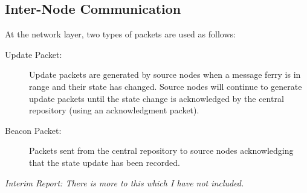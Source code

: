 \subsection{Inter-Node Communication}


At the network layer, two types of packets are used as follows:

\begin{description}
\item[Update Packet: ]
Update packets are generated by source nodes when a message ferry is in range and their state has changed. 
Source nodes will continue to generate update packets until the state change is acknowledged by the central repository (using an acknowledgment packet).
\item[Beacon Packet: ] 
Packets sent from the central repository to source nodes acknowledging that the state update has been recorded.
\end{description}

\emph{Interim Report: There is more to this which I have not included.}